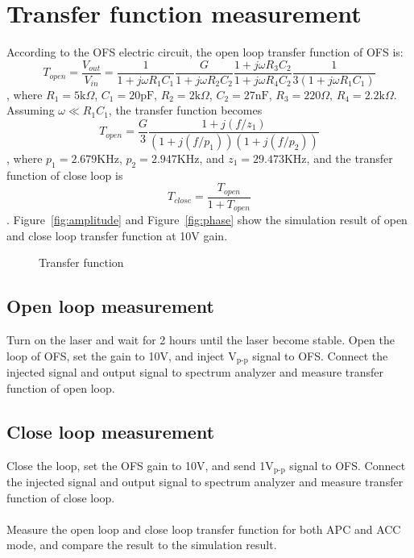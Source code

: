 \section{Transfer function measurement}
\label{tfMeasure}
According to the OFS electric circuit, the open loop transfer function of OFS is:
\begin{equation}
T_{open}=\frac{V_{out}}{V_{in}}=\frac{1}{1+j\omega R_{1}C_{1}}\frac{G}{1+j\omega R_{2}C_{2}}\frac{1+j\omega R_{3}C_{2}}{1+j\omega R_{4}C_{2}}\frac{1}{3(1+j\omega R_{1}C_{1})}
\end{equation}
, where $R_{1}=5\mbox{k}\Omega$, $C_{1}=20\mbox{pF}$, $R_{2}=2\mbox{k}\Omega$, $C_{2}=27\mbox{nF}$, $R_{3}=220\Omega$, $R_{4}=2.2\mbox{k}\Omega$. Assuming $\omega\ll R_{1}C_{1}$, the transfer function becomes
\begin{equation}
T_{open}=\frac{G}{3}\frac{1+j(f/z_{1})}{(1+j(f/p_{1}))(1+j(f/p_{2}))}
\end{equation},
where $p_{1}=2.679$KHz, $p_{2}=2.947$KHz, and $z_{1}=29.473$KHz,
and the transfer function of close loop is 
\begin{equation}
T_{close}=\frac{T_{open}}{1+T_{open}}
\end{equation}.
Figure~\ref{fig:amplitude} and Figure~\ref{fig:phase} show the simulation result of open and close loop transfer function at 10V gain.

\begin{figure}
	\begin{center}
	\caption{Transfer function}
	\label{fig:transferfunction}
	\end{center}
\end{figure}


\subsection{Open loop measurement}
\label{OFS_OLTF}
Turn on the laser and wait for 2 hours until the laser become stable. Open the loop of OFS, set the gain to 10V, and inject \underline{\qquad} $\mbox{V}_{\mbox{p-p}}$ signal to OFS. Connect the injected signal and output signal to spectrum analyzer and measure transfer function of open loop.
\subsection{Close loop measurement}
\label{OFS_CLTF}
Close the loop, set the OFS gain to 10V, and send 1$\mbox{V}_{\mbox{p-p}}$ signal to OFS. Connect the injected signal and output signal to spectrum analyzer and measure transfer function of close loop.
\\\\
\noindent Measure the open loop and close loop transfer function for both APC and ACC mode, and compare the result to the simulation result.

